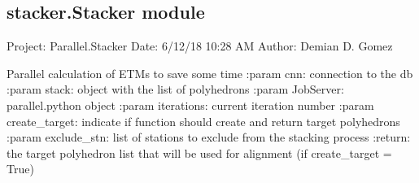 \documentclass[letterpaper,10pt,english]{sphinxmanual}
\begin{document}

\begin{fulllineitems}
\label{\detokenize{stacker:stacker.FixPlate.main}}
\pysigstartsignatures
{}
\pysigstopsignatures
\end{fulllineitems}



\subsection{stacker.Stacker module}
\label{\detokenize{stacker:module-stacker.Stacker}}\label{\detokenize{stacker:stacker-stacker-module}}
\sphinxAtStartPar
Project: Parallel.Stacker
Date: 6/12/18 10:28 AM
Author: Demian D. Gomez

\begin{fulllineitems}
\label{\detokenize{stacker:stacker.Stacker.calculate_etms}}
\pysigstartsignatures
{}
\pysigstopsignatures
\sphinxAtStartPar
Parallel calculation of ETMs to save some time
:param cnn: connection to the db
:param stack: object with the list of polyhedrons
:param JobServer: parallel.python object
:param iterations: current iteration number
:param create\_target: indicate if function should create and return target polyhedrons
:param exclude\_stn: list of stations to exclude from the stacking process
:return: the target polyhedron list that will be used for alignment (if create\_target = True)

\end{fulllineitems}

\end{document}
